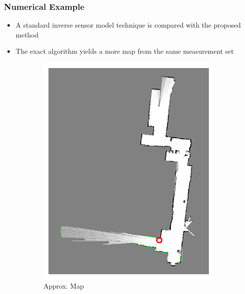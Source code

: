 \documentclass[11pt,professionalfonts,hyperref={pdftex,pdfpagemode=none,pdfstartview=FitH}]{beamer}
\renewcommand{\emph}[1]{\textit{\textbf{\color{blue}{#1}}}}
\begin{document}
\begin{frame}
\frametitle{Numerical Example}

\begin{itemize}
	\item A standard \emph{approximate} inverse sensor model technique is compared with the proposed \emph{exact} method
	\item The exact algorithm yields a more \emph{certain} map from the same measurement set
\end{itemize}

\begin{figure}[!htbp]
    \centering
    \begin{subfigure}{0.2\textwidth}
        \centering
        \includegraphics[width=\textwidth]{AISM_Image_19.pdf}
        \caption*{Approx. Map}
    \end{subfigure}
    \begin{subfigure}{0.2\textwidth}

\end{subfigure}
\end{figure}
\end{frame}
\end{document}
